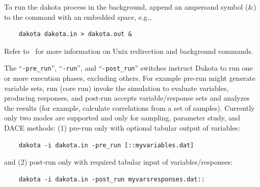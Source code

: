 
To run the dakota process in the background, append an ampersand
symbol (\&) to the command with an embedded space, e.g.,
\begin{small}
\begin{verbatim}
    dakota dakota.in > dakota.out &
\end{verbatim}
\end{small}

Refer to~\cite{And86} for more information on Unix redirection and
background commands.

The ``\texttt{-pre\_run}'', ``\texttt{-run}'', and
``\texttt{-post\_run}'' switches instruct Dakota to run one or more
execution phases, excluding others. For example pre-run might
generate variable sets, run (core run) invoke the simulation to
evaluate variables, producing responses, and post-run accepts
variable/response sets and analyzes the results (for example,
calculate correlations from a set of samples). Currently only two
modes are supported and only for sampling, parameter study, and DACE
methods: (1) pre-run only with optional tabular output of variables:
\begin{small}
\begin{verbatim}
    dakota -i dakota.in -pre_run [::myvariables.dat]
\end{verbatim}
\end{small}
and (2) post-run only with required tabular input of variables/responses:
\begin{small}
\begin{verbatim}
    dakota -i dakota.in -post_run myvarsresponses.dat::
\end{verbatim}
\end{small}


